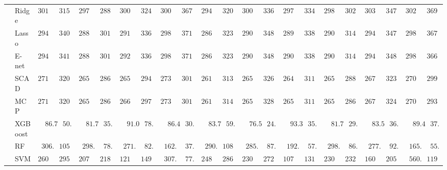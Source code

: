 \begin{tabular}{p{0.2cm}p{1cm}|p{0.6cm}p{0.6cm}|p{0.6cm}p{0.6cm}p{0.6cm}p{0.6cm}p{0.6cm}p{0.6cm}|p{0.6cm}p{0.6cm}p{0.6cm}p{0.6cm}p{0.6cm}p{0.6cm}|p{0.6cm}p{0.6cm}p{0.6cm}p{0.6cm}p{0.6cm}p{0.6cm}}
 & Ridge  & $3014.13$ & $315.25$ & $2974.47$ & $288.42$ & $3002.52$ & $324.26$ & $3003.64$ & $367.68$ & $2941.99$ & $320.14$ & $3002.37$ & $336.82$ & $2970.68$ & $334.82$ & $2984.44$ & $302.81$ & $3030.94$ & $347.15$ & $3029.35$ & $369.20$ \\
 & Lasso  & $2948.02$ & $340.05$ & $2880.77$ & $301.12$ & $2919.80$ & $336.71$ & $2980.10$ & $371.61$ & $2862.33$ & $323.79$ & $2902.47$ & $348.98$ & $2897.17$ & $338.67$ & $2903.12$ & $314.76$ & $2945.14$ & $347.24$ & $2980.34$ & $367.59$ \\
 & E-net  & $2948.68$ & $341.05$ & $2881.58$ & $301.38$ & $2923.27$ & $336.16$ & $2982.00$ & $371.96$ & $2865.23$ & $323.36$ & $2905.05$ & $348.92$ & $2900.42$ & $338.45$ & $2904.62$ & $314.65$ & $2945.49$ & $348.99$ & $2981.52$ & $366.49$ \\
 & SCAD  & $2715.42$ & $320.52$ & $2650.57$ & $286.40$ & $2657.41$ & $294.00$ & $2739.77$ & $301.19$ & $2616.41$ & $313.87$ & $2654.97$ & $326.98$ & $2648.89$ & $311.63$ & $2657.96$ & $288.24$ & $2677.46$ & $323.74$ & $2706.97$ & $299.01$ \\
 & MCP  & $2717.49$ & $320.67$ & $2651.74$ & $286.47$ & $2664.17$ & $297.22$ & $2736.35$ & $301.80$ & $2618.05$ & $314.26$ & $2655.17$ & $328.15$ & $2651.73$ & $311.48$ & $2658.32$ & $286.46$ & $2678.35$ & $324.37$ & $2705.90$ & $293.68$ \\
 & XGBoost  & $\phantom{00}86.76$ & $\phantom{0}50.53$ & $\phantom{00}81.76$ & $\phantom{0}35.39$ & $\phantom{00}91.07$ & $\phantom{0}78.31$ & $\phantom{00}86.49$ & $\phantom{0}30.68$ & $\phantom{00}83.74$ & $\phantom{0}59.81$ & $\phantom{00}76.51$ & $\phantom{0}24.18$ & $\phantom{00}93.31$ & $\phantom{0}35.71$ & $\phantom{00}81.76$ & $\phantom{0}29.35$ & $\phantom{00}83.54$ & $\phantom{0}36.71$ & $\phantom{00}89.46$ & $\phantom{0}37.10$ \\
 & RF  & $\phantom{0}306.17$ & $105.81$ & $\phantom{0}298.50$ & $\phantom{0}78.07$ & $\phantom{0}271.23$ & $\phantom{0}82.44$ & $\phantom{0}162.33$ & $\phantom{0}37.69$ & $\phantom{0}290.58$ & $108.90$ & $\phantom{0}285.74$ & $\phantom{0}87.24$ & $\phantom{0}192.32$ & $\phantom{0}57.14$ & $\phantom{0}298.37$ & $\phantom{0}86.95$ & $\phantom{0}277.48$ & $\phantom{0}92.79$ & $\phantom{0}165.87$ & $\phantom{0}55.72$ \\
 & SVM  & $2601.43$ & $295.17$ & $2079.75$ & $218.16$ & $1213.69$ & $149.53$ & $\phantom{0}307.80$ & $\phantom{0}77.48$ & $2486.14$ & $286.19$ & $2301.70$ & $272.27$ & $1078.37$ & $131.64$ & $2300.82$ & $232.77$ & $1605.57$ & $205.31$ & $\phantom{0}560.56$ & $119.93$ \\
\hline 
\end{tabular}


